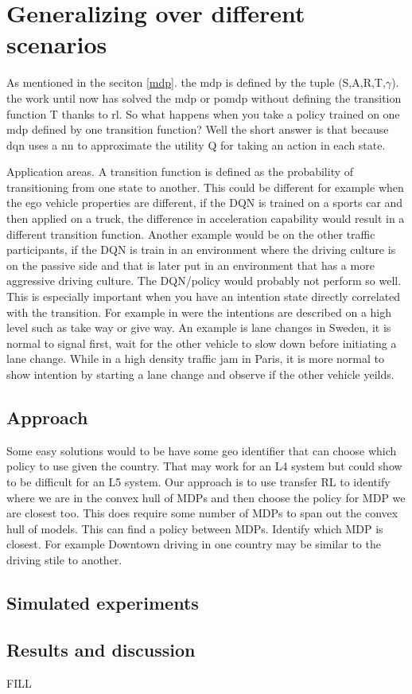\chapter{Generalizing over different scenarios}
As mentioned in the seciton \ref{mdp}. the \gls{mdp} is defined by the tuple (S,A,R,T,$\gamma$). the work until now has solved the \gls{mdp} or \gls{pomdp} without defining the transition function T thanks to \gls{rl}. So what happens when you take a policy trained on one \gls{mdp} defined by one transition function? Well the short answer is that because \gls{dqn} uses a \gls{nn} to approximate the utility Q for taking an action in each state. 

Application areas. A transition function is defined as the probability of transitioning from one state to another. This could be different for example when the ego vehicle properties are different, if the DQN is trained on a sports car and then applied on a truck, the difference in acceleration capability would result in a different transition function. Another example would be on the other traffic participants, if the DQN is train in an environment where the driving culture is on the passive side and that is later put in an environment that has a more aggressive driving culture. The DQN/policy would probably not perform so well. 
This is especially important when you have an intention state directly correlated with the transition. For example in \paperD were the intentions are described on a high level such as take way or give way. 
An example is lane changes in Sweden, it is normal to signal first, wait for the other vehicle to slow down before initiating a lane change. While in a high density traffic jam in Paris, it is more normal to show intention by starting a lane change and observe if the other vehicle yeilds. 

\section{Approach}
Some easy solutions would to be have some geo identifier that can choose which policy to use given the country. That may work for an L4 system but could show to be difficult for an L5 system. Our approach is to use transfer RL to identify where we are in the convex hull of MDPs and then choose the policy for MDP we are closest too. 
This does require some number of MDPs to span out the convex hull of models. 
This can find a policy between MDPs. 
Identify which MDP is closest. For example Downtown driving in one country may be similar to the driving stile to another. 


\section{Simulated experiments}
\section{Results and discussion}
FILL
